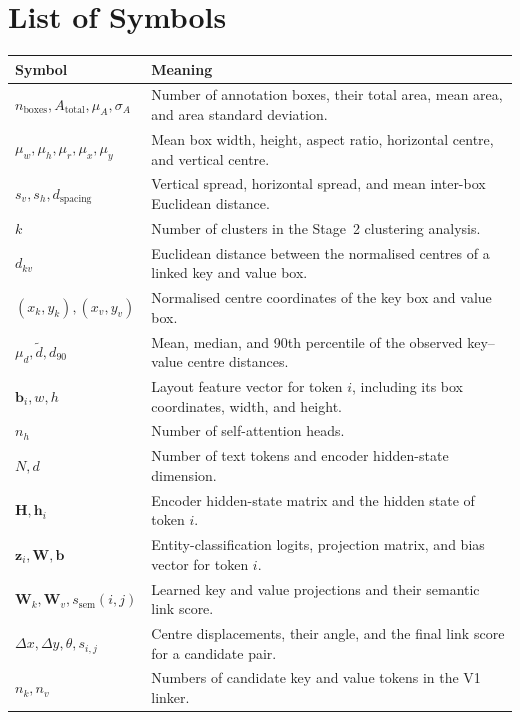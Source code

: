 \chapter*{List of Symbols}

\begingroup
\small
\renewcommand{\arraystretch}{1.12}
\begin{longtable}{@{}p{}p{}@{}}
\toprule
\textbf{Symbol} & \textbf{Meaning} \\ \midrule
$n_{\text{boxes}}, A_{\text{total}}, \mu_A, \sigma_A$
  & Number of annotation boxes, their total area, mean area, and area standard deviation. \\
$\mu_w, \mu_h, \mu_r, \mu_x, \mu_y$
  & Mean box width, height, aspect ratio, horizontal centre, and vertical centre. \\
$s_v, s_h, d_{\text{spacing}}$
  & Vertical spread, horizontal spread, and mean inter-box Euclidean distance. \\
$k$
  & Number of clusters in the Stage~2 clustering analysis. \\
$d_{kv}$
  & Euclidean distance between the normalised centres of a linked key and value box. \\
$(x_k,y_k), (x_v,y_v)$
  & Normalised centre coordinates of the key box and value box. \\
$\mu_d, \tilde{d}, d_{90}$
  & Mean, median, and 90th percentile of the observed key--value centre distances. \\
$\mathbf{b}_i, w, h$
  & Layout feature vector for token $i$, including its box coordinates, width, and height. \\
$n_h$
  & Number of self-attention heads. \\
$N, d$
  & Number of text tokens and encoder hidden-state dimension. \\
$\mathbf{H}, \mathbf{h}_i$
  & Encoder hidden-state matrix and the hidden state of token $i$. \\
$\mathbf{z}_i, \mathbf{W}, \mathbf{b}$
  & Entity-classification logits, projection matrix, and bias vector for token $i$. \\
$\mathbf{W}_k, \mathbf{W}_v, s_{\text{sem}}(i,j)$
  & Learned key and value projections and their semantic link score. \\
$\Delta x, \Delta y, \theta, s_{i,j}$
  & Centre displacements, their angle, and the final link score for a candidate pair. \\
$n_k, n_v$
  & Numbers of candidate key and value tokens in the V1 linker. \\

\end{longtable}

